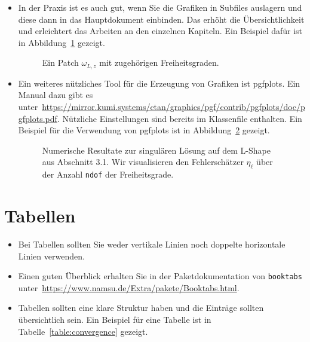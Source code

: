 \documentclass[../main.tex]{subfiles}
\begin{document}
\begin{itemize}
  \item In der Praxis ist es auch gut, wenn Sie die Grafiken in Subfiles auslagern und diese dann in das Hauptdokument einbinden. Das erhöht die Übersichtlichkeit und erleichtert das Arbeiten an den einzelnen Kapiteln. Ein Beispiel dafür ist in Abbildung~\ref{fig:patch} gezeigt.
        \begin{figure}
          \centering
          \begin{tikzpicture}
            
          \end{tikzpicture}
          \caption{Ein Patch $\omega_{L,z}$ mit zugehörigen Freiheitsgraden.}
          \label{fig:patch}
        \end{figure}

  \item Ein weiteres nützliches Tool für die Erzeugung von Grafiken ist pgfplots. Ein Manual dazu gibt es unter~\url{https://mirror.kumi.systems/ctan/graphics/pgf/contrib/pgfplots/doc/pgfplots.pdf}. Nützliche Einstellungen sind bereits im Klassenfile enthalten. Ein Beispiel für die Verwendung von pgfplots ist in Abbildung~\ref{fig:konvergenzplot} gezeigt.

        \begin{figure}
          \centering
          
          \caption{Numerische Resultate zur singulären Lösung auf dem
            L-Shape aus Abschnitt 3.1. Wir visualisieren den Fehlerschätzer $\eta_\ell$ über der
            Anzahl \texttt{ndof} der Freiheitsgrade.
          }
          \label{fig:konvergenzplot}
        \end{figure}
\end{itemize}

\section{Tabellen}
\begin{itemize}
  \item Bei Tabellen sollten Sie weder vertikale Linien noch doppelte horizontale Linien verwenden.
  \item Einen guten Überblick erhalten Sie in der Paketdokumentation von \verb$booktabs$ unter~\url{https://www.namsu.de/Extra/pakete/Booktabs.html}.
  \item Tabellen sollten eine klare Struktur haben und die Einträge sollten übersichtlich sein. Ein Beispiel für eine Tabelle ist in Tabelle~\ref{table:convergence} gezeigt.
  
  \begin{table}
    \centering
    
    \caption{Experimentelle Konvergenzraten des Fehlerschätzers aus Abschnitt~3.1.}
    \label{table:convergence}
  \end{table}
\end{itemize}
\end{document}

